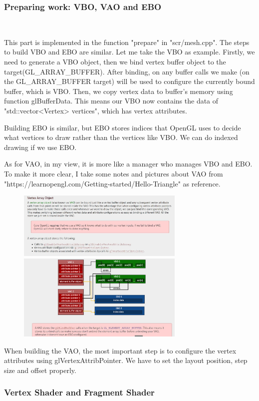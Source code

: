 \documentclass[acmtog]{acmart}
\begin{document}
\subsubsection{Preparing work: VBO, VAO and EBO}
~

This part is implemented in the function "prepare" in "scr/mesh.cpp". 
The steps to build VBO and EBO are similar. Let me take the VBO as example. 
Firstly, we need to generate a VBO object, then we bind vertex buffer object to the target(GL\_ARRAY\_BUFFER).
After binding, on any buffer calls we make (on the GL\_ARRAY\_BUFFER target) will be used to configure the currently bound buffer, which is VBO. 
Then, we copy vertex data to buffer's memory using function glBufferData.
This means our VBO now contains the data of "std::vector<Vertex> vertices", which has vertex attributes.

Building EBO is similar, but EBO stores indices that OpenGL uses to decide what vertices to draw rather than the vertices like VBO. We can do indexed drawing if we use EBO.

As for VAO, in my view, it is more like a manager who manages VBO and EBO. To make it more clear, I take some notes and pictures about VAO from "https://learnopengl.com/Getting-started/Hello-Triangle" as reference. 
\begin{figure}[h]
	\centering
	{\includegraphics[width=8cm]{VAO.JPG}}
	{\includegraphics[width=8cm]{VAO_graph.JPG}}
\end{figure}

When building the VAO, the most important step is to configure the vertex attributes using glVertexAttribPointer. We have to set the layout position, step size and offset properly. 


\subsubsection{Vertex Shader and Fragment Shader}
~
\end{document}
